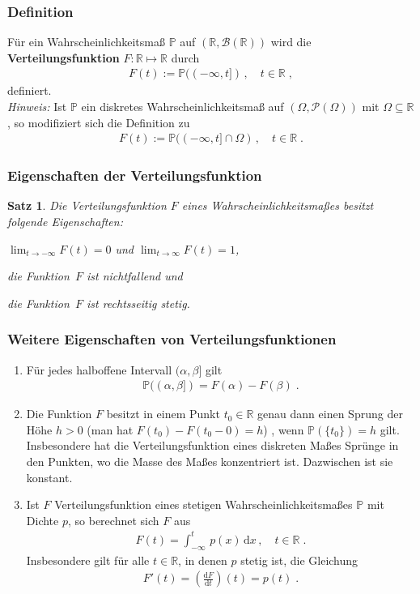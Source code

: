 \documentclass[ngerman,draft,parskip=half,twoside]{scrartcl}
\newtheorem{thm}{Satz}[section]
\newcommand*{\R}{\mathbb{R}}      %
\newcommand*{\BorelM}{\mathcal{B}}  %
\newcommand*{\PotM}{\mathcal{P}}    %
\newcommand*{\WKM}{\mathbb{P}}      %
\begin{document}
\subsubsection{Definition}
Für ein Wahrscheinlichkeitsmaß $\WKM$ auf $(\R,\BorelM(\R))$ wird die
\textbf{Verteilungsfunktion} $F\colon\R\mapsto\R$ durch
\begin{gather}
\label{F0}
F(t):=\WKM((-\infty,t])\,,\quad t\in\R  \;,
\end{gather}
definiert.\\
\textit{Hinweis:} Ist $\WKM$ ein diskretes Wahrscheinlichkeitsmaß auf $(\Omega,\PotM(\Omega))$ mit $\Omega\subseteq\R$,
so modifiziert sich die Definition zu
\begin{gather*}
  F(t):=\WKM((-\infty,t]\cap\Omega)\,,\quad t\in\R  \;.
\end{gather*}
\subsubsection{Eigenschaften der Verteilungsfunktion}
\begin{thm}
\label{VF}
Die Verteilungsfunktion $F$ eines Wahrscheinlichkeitsmaßes besitzt folgende Eigenschaften:
  \begin{eigenschaften}
   \item $\lim_{t\to -\infty} F(t)=0$ und $\lim_{t\to\infty} F(t)=1$,
   \item die Funktion~$F$ ist nichtfallend und
   \item die Funktion~$F$ ist rechtsseitig stetig.
  \end{eigenschaften}
\end{thm}
\subsubsection{Weitere Eigenschaften von Verteilungsfunktionen}
\begin{enumerate}[label=(\alph*)]
 \item
Für jedes halboffene Intervall $(\alpha,\beta]$ gilt
  \begin{gather*}
    \WKM((\alpha,\beta])= F(\alpha)-F(\beta)\;.
  \end{gather*}
 \item
Die Funktion $F$ besitzt in einem Punkt $t_0\in\R$ genau dann einen Sprung der Höhe
$h>0$ (man hat $F(t_0)-F(t_0-0)=h$) , wenn $\WKM(\{t_0\})=h$ gilt. Insbesondere hat die
Verteilungsfunktion eines diskreten Maßes Sprünge in den Punkten, wo die Masse
des Maßes konzentriert ist. Dazwischen ist sie konstant.
 \item
Ist $F$ Verteilungsfunktion eines stetigen Wahrscheinlichkeitsmaßes $\WKM$ mit Dichte $p$, so berechnet
sich $F$ aus
  \begin{gather*}
    F(t)=\int_{-\infty}^t\,p(x)\,\mathrm d x\,,\quad t\in\R\;.
  \end{gather*}
Insbesondere gilt für alle $t\in\R$, in denen $p$ stetig ist, die Gleichung
  \begin{gather*}
    F'(t)=\left(\frac{\mathrm d F}{\mathrm d t} \right)(t)= p(t)\;.
  \end{gather*}
\end{enumerate}
\end{document}
